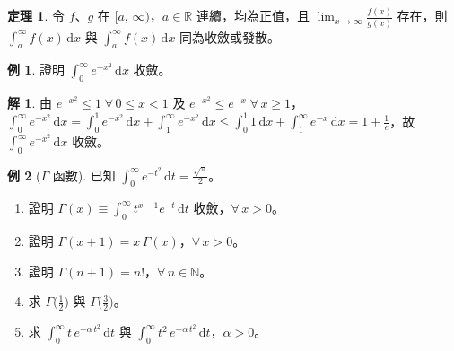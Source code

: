 \documentclass[12pt]{extarticle}
\newcommand{\ds}{\displaystyle}
\theoremstyle{definition}
\newtheorem*{thm}{定理}
\newtheorem*{ex}{例}
\newtheorem*{sol}{解}
\begin{document}
\begin{thm}
  令 $f$、$g$ 在 $[a,\,\infty)$，$a\in\mathbb{R}$ 連續，均為正值，且 $\ds\lim_{x\to\infty}\frac{f(x)}{g(x)}$ 存在，則 $\ds\int_a^\infty\!f(x)\,\text{d}x$ 與 $\ds\int_a^\infty\!f(x)\,\text{d}x$ 同為收斂或發散。
\end{thm}

\begin{ex}
  證明 $\ds\int_0^\infty\!e^{-x^2}\,\mathrm{d}x$ 收斂。
\end{ex}

\begin{sol}
  由 $\ds e^{-x^2}\leqslant 1\;\forall\,0 \leqslant x < 1$ 及 $\ds e^{-x^2}\leqslant e^{-x}\;\forall\,x\geqslant 1$，$\ds\int_0^\infty\!e^{-x^2}\,\mathrm{d}x = \int_0^1\!e^{-x^2}\,\mathrm{d}x + \int_1^\infty\!e^{-x^2}\,\mathrm{d}x\leqslant\int_0^1\!1\,\mathrm{d}x + \int_1^\infty\!e^{-x}\,\mathrm{d}x = 1 + \frac{1}{e}$，故 $\ds\int_0^\infty\!e^{-x^2}\,\mathrm{d}x$ 收斂。
\end{sol}

\begin{ex}[$\Gamma$ 函數]
  已知 $\ds\int_0^\infty\!e^{-t^2}\,\mathrm{d}t = \frac{\sqrt{\pi}}{2}$。
  \begin{enumerate}\setlength{\itemsep}{0pt}
    \item 證明 $\ds\Gamma(x)\equiv\int_0^\infty\!t^{x - 1}e^{-t}\,\mathrm{d}t$ 收斂，$\ds\forall\,x > 0$。
    \item 證明 $\ds\Gamma(x + 1) = x\,\Gamma(x)$，$\ds\forall\,x > 0$。
    \item 證明 $\ds\Gamma(n + 1) = n!$，$\ds\forall\,n\in\mathbb{N}$。
    \item 求 $\ds\Gamma\Big(\frac{1}{2}\Big)$ 與 $\ds\Gamma\Big(\frac{3}{2}\Big)$。
    \item 求 $\ds\int_0^\infty\!t\,e^{-\alpha\,t^2}\,\mathrm{d}t$ 與 $\ds\int_0^\infty\!t^2\,e^{-\alpha\,t^2}\,\mathrm{d}t$，$\alpha > 0$。
  \end{enumerate}
\end{ex}
\end{document}

